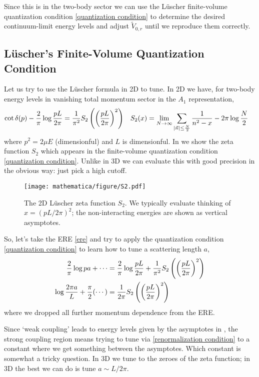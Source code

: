 Since this is in the two-body sector we can use the L\"{u}scher finite-volume quantization condition \eqref{quantization condition} to determine the desired continuum-limit energy levels and adjust $\tilde{V}_{0,r}$ until we reproduce them correctly.

\subsection{L\"{u}scher's Finite-Volume Quantization Condition}

Let us try to use the L\"{u}scher formula in 2D \cite{Zhu:2019dho,Korber:2019cuq} to tune.
In 2D we have, for two-body energy levels in vanishing total momentum sector in the $A_1$ representation,
\begin{align}
	\cot \delta(p) - \frac{2}{\pi} \log \frac{pL}{2\pi} &= \frac{1}{\pi^2} S_2\left(\left(\frac{pL}{2\pi}\right)^2\right)
	&	
	S_2(x) &= \lim_{N\rightarrow\infty} \sum_{\left| \vec{n} \right| \leq \frac{N}{2}} \frac{1}{n^2-x} - 2\pi \log \frac{N}{2}
	\label{eq:quantization condition}
\end{align}
where $p^2=2\mu E$ (dimensionful) and $L$ is dimensionful.
In  we show the zeta function $S_2$ which appears in the finite-volume quantization condition \eqref{quantization condition}.
Unlike in 3D we can evaluate this with good precision in the obvious way: just pick a high cutoff.
\begin{figure}
	\texttt{[image: mathematica/figure/S2.pdf]}
	\caption{The 2D L\"{u}scher zeta function $S_2$.  We typically evaluate thinking of $x = (pL/2\pi)^2$; the non-interacting energies are shown as vertical asymptotes.}
	\label{fig:S2}
\end{figure}

So, let's take the ERE \eqref{ere} and try to apply the quantization condition \eqref{quantization condition} to learn how to tune a scattering length $a$,
\begin{align}
	\frac{2}{\pi} \log pa + \cdots
	&=
	\frac{2}{\pi} \log \frac{pL}{2\pi} + \frac{1}{\pi^2} S_2\left(\left(\frac{pL}{2\pi}\right)^2\right)
	\\
	\log \frac{2\pi a}{L} + \frac{\pi}{2}(\cdots) &= \frac{1}{2\pi} S_2\left(\left(\frac{pL}{2\pi}\right)^2\right)
	\label{eq:renormalization condition}
\end{align}
where we dropped all further momentum dependence from the ERE.

Since `weak coupling' leads to energy levels given by the asymptotes in , the strong coupling region means trying to tune via \eqref{renormalization condition} to a constant where we get something between the asymptotes.
Which constant is somewhat a tricky question.
In 3D we tune to the zeroes of the zeta function; in 3D the best we can do is tune $a \sim L/2\pi$.

